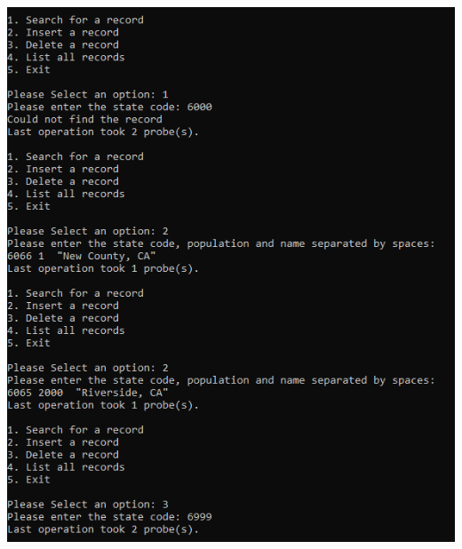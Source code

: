 \documentclass[titlepage]{article}
\begin{document}
\includegraphics[]{Small_Input/LF_0_25/ChainHash_2.png}   \newpage
\end{document}
